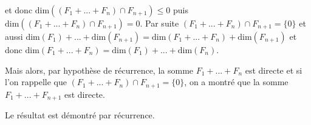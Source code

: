 {{ 
et donc $\text{dim}((F_1+...+F_n)\cap F_{n+1})\leqslant0$ puis $\text{dim}((F_1+...+F_n)\cap F_{n+1})= 0$. Par suite $(F_1+...+F_n)\cap F_{n+1}=\{0\}$ et aussi $\text{dim}(F_1)+...+\text{dim}(F_{n+1})=\text{dim}(F_1+...+F_n) +\text{dim}(F_{n+1})$ et donc $\text{dim}(F_1+...+F_n)=\text{dim}(F_1)+ ... +\text{dim}(F_n)$.

Mais alors, par hypothèse de récurrence, la somme $F_1+...+F_n$ est directe et si l'on rappelle que 
$(F_1+...+F_n)\cap F_{n+1}=\{0\}$, on a montré que la somme $F_1+...+F_{n+1}$ est directe.

Le résultat est démontré par récurrence.}
}